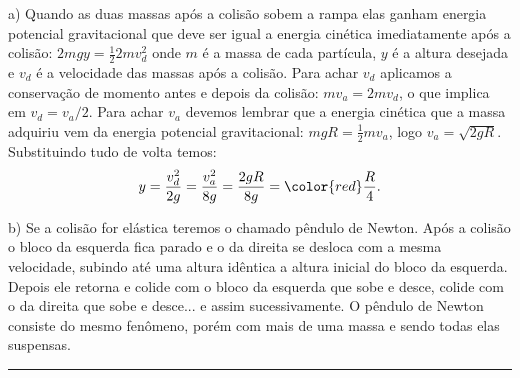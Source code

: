 \documentclass[12pt]{article}
\newenvironment{problem}[2][{\color{red}Problema}]{\begin{trivlist}
\item[\hskip \labelsep {\bfseries #1}\hskip \labelsep {\bfseries #2.}]}{\end{trivlist}}
\begin{document}
\begin{problem}{2}
a) Quando as duas massas após a colisão sobem a rampa elas ganham energia potencial gravitacional que deve ser igual a energia cinética imediatamente após a colisão: $2mgy = \frac{1}{2}2mv_d^2$ onde $m$ é a massa de cada partícula, $y$ é a altura desejada e $v_d$ é a velocidade das massas após a colisão. Para achar $v_d$ aplicamos a conservação de momento antes e depois da colisão: $mv_a = 2mv_d$, o que implica em $v_d = v_a/2$. Para achar $v_a$ devemos lembrar que a energia cinética que a massa adquiriu vem da energia potencial gravitacional: $mgR = \frac{1}{2}mv_a$, logo $v_a = \sqrt{2gR}$. Substituindo tudo de volta temos:
\begin{equation}
y = \dfrac{v_d^2}{2g} = \dfrac{v_a^2}{8g} = \dfrac{2gR}{8g} = {\color{red}\dfrac{R}{4}}. \nonumber  
\end{equation}

\noindent
b) Se a colisão for elástica teremos o chamado pêndulo de Newton. Após a colisão o bloco da esquerda fica parado e o da direita se desloca com a mesma velocidade, subindo até uma altura idêntica a altura inicial do bloco da esquerda. Depois ele retorna e colide com o bloco da esquerda que sobe e desce, colide com o da direita que sobe e desce... e assim sucessivamente. O pêndulo de Newton consiste do mesmo fenômeno, porém com mais de uma massa e sendo todas elas suspensas.

\end{problem}


\begin{center}
\noindent\rule{13cm}{0.5pt}
\end{center}
\end{document}
